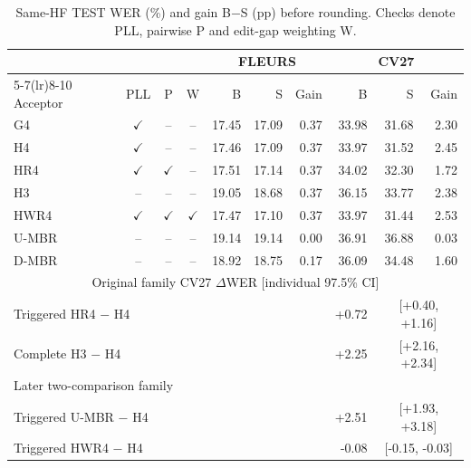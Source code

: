 \begin{table}[!t]\centering\footnotesize
\caption{Same-HF TEST WER (\%) and gain B$-$S (pp) before rounding. Checks denote PLL, pairwise P and edit-gap weighting W.}\label{tab:hfacceptors}
\setlength{\tabcolsep}{2pt}\renewcommand{\arraystretch}{1.00}
\begin{tabular}{@{}lcccrrrrrr@{}}\toprule
 & & & & \multicolumn{3}{c}{FLEURS} & \multicolumn{3}{c}{CV27}\\
\cmidrule(lr){5-7}\cmidrule(lr){8-10}
Acceptor & PLL & P & W & B & S & Gain & B & S & Gain\\\midrule
G4 & $\checkmark$ & -- & -- & 17.45 & 17.09 & 0.37 & 33.98 & 31.68 & 2.30\\
H4 & $\checkmark$ & -- & -- & 17.46 & 17.09 & 0.37 & 33.97 & 31.52 & 2.45\\
HR4 & $\checkmark$ & $\checkmark$ & -- & 17.51 & 17.14 & 0.37 & 34.02 & 32.30 & 1.72\\
H3 & -- & -- & -- & 19.05 & 18.68 & 0.37 & 36.15 & 33.77 & 2.38\\
HWR4 & $\checkmark$ & $\checkmark$ & $\checkmark$ & 17.47 & 17.10 & 0.37 & 33.97 & 31.44 & 2.53\\
U-MBR & -- & -- & -- & 19.14 & 19.14 & 0.00 & 36.91 & 36.88 & 0.03\\
D-MBR & -- & -- & -- & 18.92 & 18.75 & 0.17 & 36.09 & 34.48 & 1.60\\
\midrule\multicolumn{10}{c}{Original family CV27 $\Delta$WER [individual 97.5\% CI]}\\
\multicolumn{7}{l}{Triggered HR4 $-$ H4} & +0.72 & \multicolumn{2}{c}{[+0.40, +1.16]}\\
\multicolumn{7}{l}{Complete H3 $-$ H4} & +2.25 & \multicolumn{2}{c}{[+2.16, +2.34]}\\
\multicolumn{10}{l}{Later two-comparison family}\\
\multicolumn{7}{l}{Triggered U-MBR $-$ H4} & +2.51 & \multicolumn{2}{c}{[+1.93, +3.18]}\\
\multicolumn{7}{l}{Triggered HWR4 $-$ H4} & -0.08 & \multicolumn{2}{c}{[-0.15, -0.03]}\\
\bottomrule\end{tabular}\end{table}
